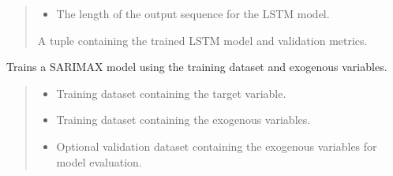 \documentclass[letterpaper,10pt,english]{sphinxmanual}
\begin{document}
\begin{fulllineitems}
\begin{fulllineitems}
\begin{quote}
\begin{description}
\begin{itemize}
\item {} 
\sphinxAtStartPar
{} \textendash{} The length of the output sequence for the LSTM model.

\end{itemize}

\sphinxAtStartPar
A tuple containing the trained LSTM model and validation metrics.

\end{description}\end{quote}

\end{fulllineitems}


\begin{fulllineitems}
\label{\detokenize{docs/training_module:training_module.ModelTraining.train_SARIMAX_model}}
\pysigstartsignatures
{}
\pysigstopsignatures
\sphinxAtStartPar
Trains a SARIMAX model using the training dataset and exogenous variables.
\begin{quote}\begin{description}
\begin{itemize}
\item {} 
\sphinxAtStartPar
{} \textendash{} Training dataset containing the target variable.

\item {} 
\sphinxAtStartPar
{} \textendash{} Training dataset containing the exogenous variables.

\item {} 
\sphinxAtStartPar
{} \textendash{} Optional validation dataset containing the exogenous variables for model evaluation.


\end{itemize}
\end{description}
\end{quote}
\end{fulllineitems}
\end{fulllineitems}
\end{document}
